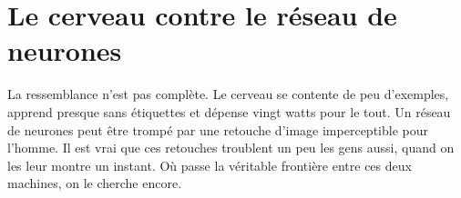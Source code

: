 \section*{Le cerveau contre le réseau de neurones}

La ressemblance n'est pas complète. Le cerveau se contente de peu d'exemples, apprend presque sans étiquettes et dépense vingt watts pour le tout. Un réseau de neurones peut être trompé par une retouche d'image imperceptible pour l'homme. Il est vrai que ces retouches troublent un peu les gens aussi, quand on les leur montre un instant. Où passe la véritable frontière entre ces deux machines, on le cherche encore.

